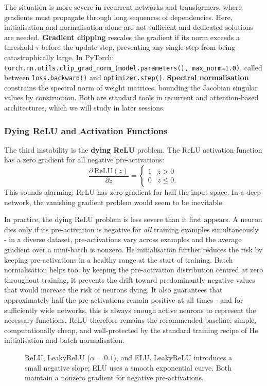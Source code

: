 The situation is more severe in recurrent networks and transformers, where gradients must propagate through long sequences of dependencies. Here, initialisation and normalisation alone are not sufficient and dedicated solutions are needed. \textbf{Gradient clipping} rescales the gradient if its norm exceeds a threshold $\tau$ before the update step, preventing any single step from being catastrophically large. In PyTorch: \texttt{torch.nn.utils.clip\_grad\_norm\_(model.parameters(), max\_norm=1.0)}, called between \texttt{loss.backward()} and \texttt{optimizer.step()}. \textbf{Spectral normalisation} constrains the spectral norm of weight matrices, bounding the Jacobian singular values by construction. Both are standard tools in recurrent and attention-based architectures, which we will study in later sessions.

\subsubsection{Dying ReLU and Activation Functions}

The third instability is the \textbf{dying ReLU} problem. The ReLU activation function has a zero gradient for all negative pre-activations:
\begin{equation}
    \frac{\partial\,\text{ReLU}(z)}{\partial z} = \begin{cases} 1 & z > 0 \\ 0 & z \leq 0. \end{cases}
\end{equation}
This sounds alarming: ReLU has zero gradient for half the input space. In a deep network, the vanishing gradient problem would seem to be inevitable.

In practice, the dying ReLU problem is less severe than it first appears. A neuron dies only if its pre-activation is negative for \emph{all} training examples simultaneously - in a diverse dataset, pre-activations vary across examples and the average gradient over a mini-batch is nonzero. He initialisation further reduces the risk by keeping pre-activations in a healthy range at the start of training. Batch normalisation helps too: by keeping the pre-activation distribution centred at zero throughout training, it prevents the drift toward predominantly negative values that would increase the risk of neurons dying. It also guarantees that approximately half the pre-activations remain positive at all times - and for sufficiently wide networks, this is always enough active neurons to represent the necessary functions. ReLU therefore remains the recommended baseline: simple, computationally cheap, and well-protected by the standard training recipe of He initialisation and batch normalisation.
\begin{figure}
\centering
{}
\resizebox{0.36\textwidth}{!}{}
\caption{ReLU, LeakyReLU ($\alpha=0.1$), and ELU. LeakyReLU introduces a small negative slope; ELU uses a smooth exponential curve. Both maintain a nonzero gradient for negative pre-activations.}
\label{fig:activation_functions}
\end{figure}

